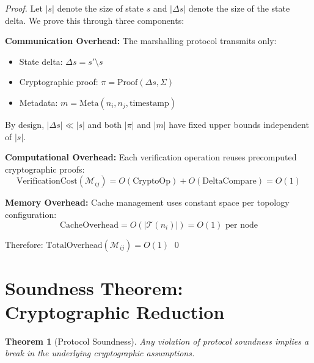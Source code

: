 \documentclass[11pt,a4paper]{article}
\newtheorem{theorem}{Theorem}[section]
\theoremstyle{definition}
\theoremstyle{remark}
\newcommand{\M}{\mathcal{M}}
\newcommand{\T}{\mathcal{T}}
\begin{document}
\begin{proof}
Let $|s|$ denote the size of state $s$ and $|\Delta s|$ denote the size of the state delta. We prove this through three components:

\textbf{Communication Overhead:} The marshalling protocol transmits only:
\begin{itemize}
    \item State delta: $\Delta s = s' \setminus s$
    \item Cryptographic proof: $\pi = \text{Proof}(\Delta s, \Sigma)$
    \item Metadata: $m = \text{Meta}(n_i, n_j, \text{timestamp})$
\end{itemize}

By design, $|\Delta s| \ll |s|$ and both $|\pi|$ and $|m|$ have fixed upper bounds independent of $|s|$.

\textbf{Computational Overhead:} Each verification operation reuses precomputed cryptographic proofs:
$$\text{VerificationCost}(\M_{ij}) = O(\text{CryptoOp}) + O(\text{DeltaCompare}) = O(1)$$

\textbf{Memory Overhead:} Cache management uses constant space per topology configuration:
$$\text{CacheOverhead} = O(|\T(n_i)|) = O(1) \text{ per node}$$

Therefore: $\text{TotalOverhead}(\M_{ij}) = O(1)$ \qed
\end{proof}

\section{Soundness Theorem: Cryptographic Reduction}

\begin{theorem}[Protocol Soundness]
Any violation of protocol soundness implies a break in the underlying cryptographic assumptions.
\end{theorem}
\end{document}
